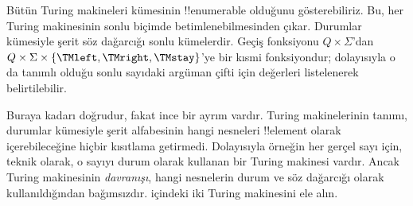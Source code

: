 


\begin{explain}
Bütün Turing makineleri kümesinin !!{enumerable} olduğunu gösterebiliriz.
Bu, her Turing makinesinin sonlu biçimde betimlenebilmesinden çıkar. Durumlar
kümesiyle şerit söz dağarcığı sonlu kümelerdir. Geçiş fonksiyonu
$Q\times\Sigma$'dan
$Q\times\Sigma\times\{\TMleft,\TMright,\TMstay\}$'ye bir kısmi
fonksiyondur; dolayısıyla o da tanımlı olduğu sonlu sayıdaki argüman çifti
için değerleri listelenerek belirtilebilir.

Buraya kadarı doğrudur, fakat ince bir ayrım vardır. Turing makinelerinin
tanımı, durumlar kümesiyle şerit alfabesinin hangi nesneleri !!{element}
olarak içerebileceğine hiçbir kısıtlama getirmedi. Dolayısıyla örneğin her
gerçel sayı için, teknik olarak, o sayıyı durum olarak kullanan bir Turing
makinesi vardır. Ancak Turing makinesinin \emph{davranışı}, hangi nesnelerin
durum ve söz dağarcığı olarak kullanıldığından bağımsızdır.
 içindeki iki Turing makinesini ele alın.
\begin{figure}
\begin{center}
\\
\end{center}
\end{figure}
\end{explain}
